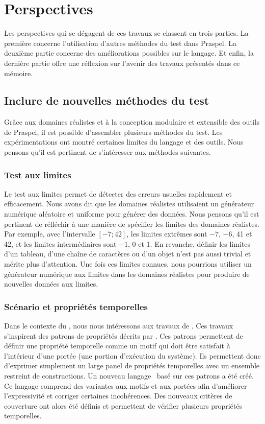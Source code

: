 \section{Perspectives}
\label{section:conclusions:perspectives}

Les perspectives qui se dégagent de ces travaux se classent en trois parties. La
première concerne l'utilisation d'autres méthodes du test dans Praspel. La
deuxième partie concerne des améliorations possibles sur le langage. Et enfin,
la dernière partie offre une réflexion sur l'avenir des travaux présentés dans
ce mémoire.

\subsection{Inclure de nouvelles méthodes du test}

Grâce aux domaines réalistes et à la conception modulaire et extensible des
outils de Praspel, il est possible d'assembler plusieurs méthodes du test. Les
expérimentations ont montré certaines limites du langage et des outils. Nous
pensons qu'il est pertinent de s'intéresser aux méthodes suivantes.

\subsubsection{Test aux limites}

Le test aux limites permet de détecter des erreurs usuelles rapidement et
efficacement. Nous avons dit que les domaines réalistes utilisaient un
générateur numérique aléatoire et uniforme pour générer des données. Nous
pensons qu'il est pertinent de réfléchir à une manière de spécifier les limites
des domaines réalistes. Par exemple, avec l'intervalle $[-7; 42]$, les limites
extrêmes sont $-7$, $-6$, 41 et 42, et les limites intermédiaires sont $-1$, 0
et 1. En revanche, définir les limites d'un tableau, d'une chaîne de caractères
ou d'un objet n'est pas aussi trivial et mérite plus d'attention. Une fois ces
limites connues, nous pourrions utiliser un générateur numérique aux limites
dans les domaines réalistes pour produire de nouvelles données aux limites.

\subsubsection{Scénario et propriétés temporelles}

Dans le contexte du , nous nous intéressons
aux travaux de . Ces travaux s'inspirent des patrons de
propriétés décrits par . Ces patrons permettent de définir une
propriété temporelle comme un motif qui doit être satisfait à l'intérieur d'une
portée (une portion d'exécution du système). Ils permettent donc d'exprimer
simplement un large panel de propriétés temporelles avec un ensemble restreint
de constructions. Un nouveau langage~ basé sur ces
patrons a été créé. Ce langage comprend des variantes aux motifs et aux portées
afin d'améliorer l'expressivité et corriger certaines incohérences. Des nouveaux
critères de couverture ont alors été définis et permettent de vérifier plusieurs
propriétés temporelles.

